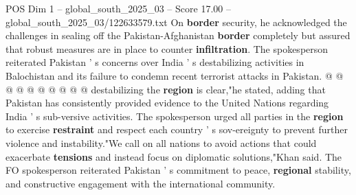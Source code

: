 \begin{textsample}{POS Dim 1 – global\_south\_2025\_03 – Score 17.00 – global\_south\_2025\_03/122633579.txt}
On \textbf{border} security, he acknowledged the challenges in sealing off the Pakistan-Afghanistan \textbf{border} completely but assured that robust measures are in place to counter \textbf{infiltration}.
The spokesperson reiterated Pakistan ' s concerns over India ' s destabilizing activities in Balochistan and its failure to condemn recent terrorist attacks in Pakistan. @ @ @ @ @ @ @ @ @ @ destabilizing the \textbf{region} is clear,"he stated, adding that Pakistan has consistently provided evidence to the United Nations regarding India ' s sub-versive activities.
The spokesperson urged all parties in the \textbf{region} to exercise \textbf{restraint} and respect each country ' s sov-ereignty to prevent further violence and instability."We call on all nations to avoid actions that could exacerbate \textbf{tensions} and instead focus on diplomatic solutions,"Khan said.
The FO spokesperson reiterated Pakistan ' s commitment to peace, \textbf{regional} stability, and constructive engagement with the international community.

\end{textsample}

